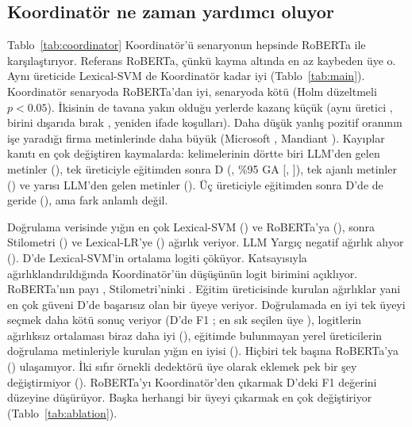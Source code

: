 \documentclass[journal]{IEEEtran}
\begin{document}

\subsection{Koordinatör ne zaman yardımcı oluyor}
Tablo~\ref{tab:coordinator} Koordinatör'ü \GapN{} senaryonun hepsinde RoBERTa ile karşılaştırıyor. Referans RoBERTa,
çünkü kayma altında en az kaybeden üye o. Aynı üreticide Lexical-SVM de Koordinatör kadar iyi
(Tablo~\ref{tab:main}). Koordinatör \GapWins{} senaryoda RoBERTa'dan iyi, \GapLosses{} senaryoda kötü (Holm
düzeltmeli $p<0.05$). İkisinin de tavana yakın olduğu yerlerde kazanç küçük (aynı üretici \GapInGenerator{}, birini
dışarıda bırak \GapLeaveOneOut{}, yeniden ifade koşulları). Daha düşük yanlış pozitif oranının işe yaradığı firma
metinlerinde daha büyük (Microsoft \GapMicrosoftAbc{}, Mandiant \GapMandiantAbc{}). Kayıplar kanıtı en çok
değiştiren kaymalarda: kelimelerinin dörtte biri LLM'den gelen metinler (\GapTwoFiveLlmAbc{}), tek üreticiyle
eğitimden sonra D (\GapDOneGenerator{}, \%95 GA [\GapLoDOneGenerator{}, \GapHiDOneGenerator{}]), tek ajanlı metinler
(\GapSingleAgentAbc{}) ve yarısı LLM'den gelen metinler (\GapFiveZeroLlmAbc{}). Üç üreticiyle eğitimden sonra D'de de
geride (\GapDAbc{}), ama fark anlamlı değil.

Doğrulama verisinde yığın en çok Lexical-SVM (\WgtLexsvm{}) ve RoBERTa'ya (\WgtTrans{}), sonra Stilometri
(\WgtStylo{}) ve Lexical-LR'ye (\WgtLexlr{}) ağırlık veriyor. LLM Yargıç negatif ağırlık alıyor (\WgtJudge{}). D'de
Lexical-SVM'in ortalama logiti çöküyor. Katsayısıyla ağırlıklandırıldığında Koordinatör'ün düşüşünün
\DropLexsvm{} logit birimini açıklıyor. RoBERTa'nın payı \DropTrans{}, Stilometri'ninki \DropStylo{}. Eğitim
üreticisinde kurulan ağırlıklar yani en çok güveni D'de başarısız olan bir üyeye veriyor. Doğrulamada en iyi tek
üyeyi seçmek daha kötü sonuç veriyor (D'de F1 \ScDOneGeneratorBestVal{}; en sık seçilen üye \BestValTop{}),
logitlerin ağırlıksız ortalaması biraz daha iyi (\ScDOneGeneratorCoordMean{}), eğitimde bulunmayan yerel
üreticilerin doğrulama metinleriyle kurulan yığın en iyisi (\ScDOneGeneratorCoordUnseen{}). Hiçbiri tek başına
RoBERTa'ya (\ScDOneGeneratorTrans{}) ulaşamıyor. İki sıfır örnekli dedektörü üye olarak eklemek pek bir şey
değiştirmiyor (\ScDOneGeneratorCoordZero{}). RoBERTa'yı Koordinatör'den çıkarmak D'deki F1 değerini
\CoordNoTransD{} düzeyine düşürüyor. Başka herhangi bir üyeyi çıkarmak en çok \CoordDropMaxOther{} değiştiriyor
(Tablo~\ref{tab:ablation}).


\end{document}
